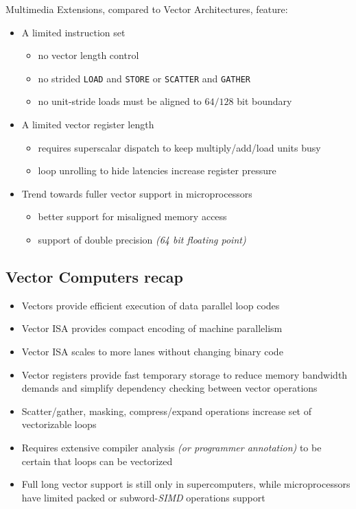 \documentclass[english]{article}
\begin{document}
Multimedia Extensions, compared to Vector Architectures, feature:

\begin{itemize}
  \item A limited instruction set
        \begin{itemize}
          \item no vector length control
          \item no strided \texttt{LOAD} and \texttt{STORE} or \texttt{SCATTER} and \texttt{GATHER}
          \item no unit-stride loads must be aligned to \(64/128\) bit boundary
        \end{itemize}
  \item A limited vector register length
        \begin{itemize}
          \item requires superscalar dispatch to keep multiply/add/load units busy
          \item loop unrolling to hide latencies increase register pressure
        \end{itemize}
  \item Trend towards fuller vector support in microprocessors
        \begin{itemize}
          \item better support for misaligned memory access
          \item support of double precision \textit{(64 bit floating point)}
        \end{itemize}
\end{itemize}

\subsection{Vector Computers recap}

\begin{itemize}
  \item Vectors provide efficient execution of data parallel loop codes
  \item Vector ISA provides compact encoding of machine parallelism
  \item Vector ISA scales to more lanes without changing binary code
  \item Vector registers provide fast temporary storage to reduce memory bandwidth demands and simplify dependency checking between vector operations
  \item Scatter/gather, masking, compress/expand operations increase set of vectorizable loops
  \item Requires extensive compiler analysis \textit{(or programmer annotation)} to be certain that loops can be vectorized
  \item Full long vector support is still only in supercomputers, while microprocessors have limited packed or subword-\textit{SIMD} operations support
\end{itemize}
\end{document}
